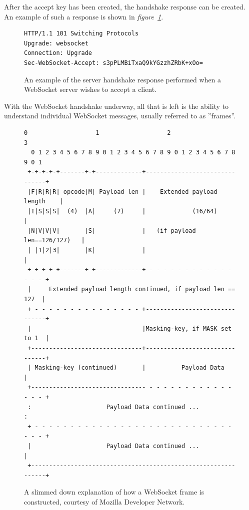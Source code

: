 After the accept key has been created, the handshake response can be created. An example of such a response is shown in \textit{figure~\ref{handshake-response}}.

\begin{figure}[H]
	\begin{center}
		\begin{lstlisting}
HTTP/1.1 101 Switching Protocols
Upgrade: websocket
Connection: Upgrade
Sec-WebSocket-Accept: s3pPLMBiTxaQ9kYGzzhZRbK+xOo=
		\end{lstlisting}
		\caption{An example of the server handshake response performed when a WebSocket server wishes to accept a client\cite{ws-howto}.}
		\label{handshake-response}
	\end{center}
\end{figure}

With the WebSocket handshake underway, all that is left is the ability to understand individual WebSocket messages, usually referred to as ''frames''\cite{ws-howto}.

\begin{figure}[H]
	\begin{center}
		\begin{lstlisting}[language=smalltext]
  0                   1                   2                   3
  0 1 2 3 4 5 6 7 8 9 0 1 2 3 4 5 6 7 8 9 0 1 2 3 4 5 6 7 8 9 0 1
 +-+-+-+-+-------+-+-------------+-------------------------------+
 |F|R|R|R| opcode|M| Payload len |    Extended payload length    |
 |I|S|S|S|  (4)  |A|     (7)     |             (16/64)           |
 |N|V|V|V|       |S|             |   (if payload len==126/127)   |
 | |1|2|3|       |K|             |                               |
 +-+-+-+-+-------+-+-------------+ - - - - - - - - - - - - - - - +
 |     Extended payload length continued, if payload len == 127  |
 + - - - - - - - - - - - - - - - +-------------------------------+
 |                               |Masking-key, if MASK set to 1  |
 +-------------------------------+-------------------------------+
 | Masking-key (continued)       |          Payload Data         |
 +-------------------------------- - - - - - - - - - - - - - - - +
 :                     Payload Data continued ...                :
 + - - - - - - - - - - - - - - - - - - - - - - - - - - - - - - - +
 |                     Payload Data continued ...                |
 +---------------------------------------------------------------+
		\end{lstlisting}
		\caption{A slimmed down explanation of how a WebSocket frame is constructed, courtesy of Mozilla Developer Network\cite{ws-howto}.}
		\label{ws-frame}
	\end{center}
\end{figure}

